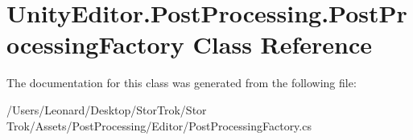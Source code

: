 \hypertarget{class_unity_editor_1_1_post_processing_1_1_post_processing_factory}{}\section{Unity\+Editor.\+Post\+Processing.\+Post\+Processing\+Factory Class Reference}
\label{class_unity_editor_1_1_post_processing_1_1_post_processing_factory}


The documentation for this class was generated from the following file\+:\begin{DoxyCompactItemize}
\item 
/\+Users/\+Leonard/\+Desktop/\+Stor\+Trok/\+Stor Trok/\+Assets/\+Post\+Processing/\+Editor/Post\+Processing\+Factory.\+cs\end{DoxyCompactItemize}

